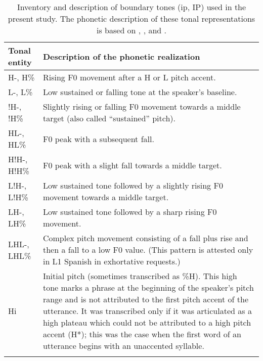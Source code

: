 \begin{table}
\caption{Inventory and description of boundary tones (ip, IP) used in the present study. The phonetic description of these tonal representations is based on \citet{AguilarEtAl2009}, \citet{Estebas-VilaplanaPrieto2008}, \citet{GabrielEtAl2010} and  \citet{GiliFivelaEtAl2015}.\label{tab:2.4b}}
\begin{tabularx}{\textwidth}{lQ}
\lsptoprule
{Tonal entity} & {Description of the phonetic realization}\\
\midrule
H-, H\% & Rising F0 movement after a H or L pitch accent.\\
\tablevspace
L-, L\% & Low sustained or falling tone at the speaker’s baseline.\\
\tablevspace
!H-, !H\% & Slightly rising or falling F0 movement towards a middle target (also called “sustained” pitch).\\
\tablevspace
HL-, HL\% & F0 peak with a subsequent fall.\\
\tablevspace
H!H-, H!H\% & F0 peak with a slight fall towards a middle target.\\
\tablevspace
L!H-, L!H\% & Low sustained tone followed by a slightly rising F0 movement towards a middle target.\\
\tablevspace
LH-, LH\% & Low sustained tone followed by a sharp rising F0 movement.\\
\tablevspace
LHL-, LHL\% & Complex pitch movement consisting of a fall plus rise and then a fall to a low F0 value. (This pattern is attested only in L1 Spanish in exhortative requests.)\\
\tablevspace
Hi & Initial pitch (sometimes transcribed as \%H). This high tone marks a phrase at the beginning of the speaker’s pitch range and is not attributed to the first pitch accent of the utterance. It was transcribed only if it was articulated as a high plateau which could not be attributed to a high pitch accent (H*); this was the case when the first word of an utterance begins with an unaccented syllable. \\
\lspbottomrule
\end{tabularx}
\end{table}


